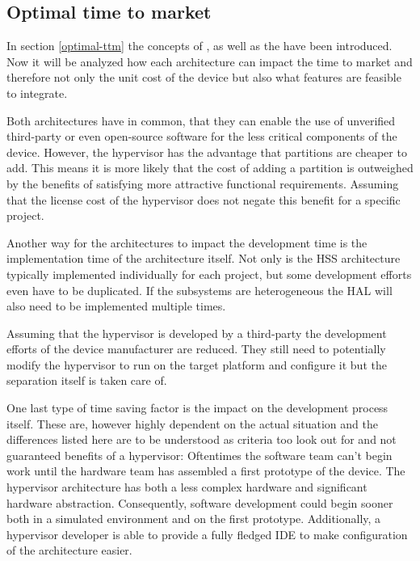\subsection{Optimal time to market}
In section \ref{optimal-ttm} the concepts of , as well as the have been introduced. Now it will be analyzed how each architecture can impact the time to market and therefore not only the unit cost of the device but also what features are feasible to integrate.

Both architectures have in common, that they can enable the use of unverified third-party or even open-source software for the less critical  components of the device. However, the hypervisor has the advantage that partitions are cheaper to add. This means it is more likely that the cost of adding a partition is outweighed by the benefits of satisfying more attractive functional requirements. Assuming that the license cost of the hypervisor does not negate this benefit for a specific project.

Another way for the architectures to impact the development time is the implementation time of the architecture itself. Not only is the \gls{HSS} architecture typically implemented individually for each project, but some development efforts even have to be duplicated. If the subsystems are heterogeneous the \gls{HAL} will also need to be implemented multiple times. 

Assuming that the hypervisor is developed by a third-party the development efforts of the device manufacturer are reduced. They still need to potentially modify the hypervisor to run on the target platform and configure it but the separation itself is taken care of.

One last type of time saving factor is the impact on the development process itself. These are, however highly dependent on the actual situation and the differences listed here are to be understood as criteria too look out for and not guaranteed benefits of a hypervisor: Oftentimes the software team can't begin work until the hardware team has assembled a first prototype of the device. The hypervisor architecture has both a less complex hardware and significant hardware abstraction. Consequently, software development could begin sooner both in a simulated environment and on the first prototype. Additionally, a hypervisor developer is able to provide a fully fledged \gls{IDE} to make configuration of the architecture easier.

